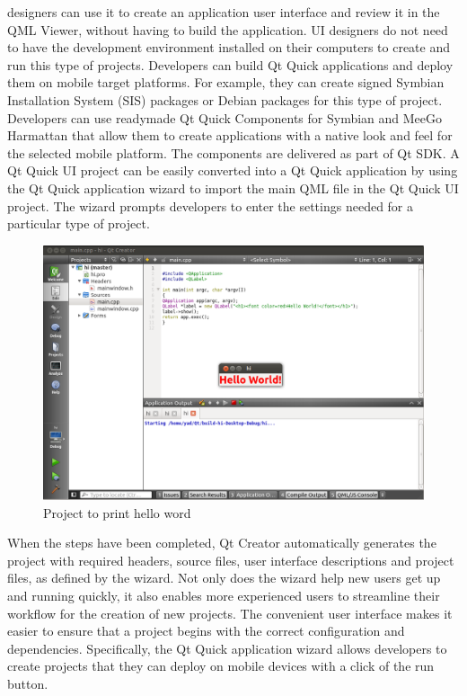designers  can  use  it  to  create  an  application  user  interface  and  review  it  in  the  QML  Viewer,  without
having  to  build  the  application.   UI  designers  do  not  need to have the development environment installed
on their computers to create and run this type of projects.
Developers  can  build  Qt  Quick  applications  and  deploy  them  on  mobile  target platforms. For example,
they  can  create  signed  Symbian  Installation  System  (SIS)  packages or Debian packages for this type of
project.  Developers  can  use  ready­made  Qt  Quick  Components  for  Symbian  and  MeeGo  Harmattan
that  allow  them  to  create  applications  with  a  native  look  and  feel  for  the  selected  mobile  platform.  The
components  are  delivered  as  part  of  Qt SDK. A Qt Quick UI project can be easily  converted into a Qt
Quick  application  by using the Qt Quick  application wizard to import the main QML file in the Qt Quick
UI project. The wizard prompts developers to enter the settings needed for a particular type of project.

\begin{figure}[h]
\begin{center}
\includegraphics[scale=0.4]{images/hi.png}
\caption{Project to print hello word}
\end{center}
\end{figure}

When  the  steps  have  been  completed,  Qt  Creator  automatically  generates  the  project  with  required
headers,  source  files,  user  interface  descriptions  and  project  files,  as  defined  by  the  wizard.  Not  only
does  the  wizard  help  new  users  get  up  and  running  quickly,  it  also  enables  more  experienced  users  to
streamline  their  workflow  for  the  creation  of new projects. The convenient user interface makes it easier
to  ensure  that  a  project  begins  with  the  correct  configuration  and  dependencies.  Specifically,  the  Qt
Quick  application  wizard  allows  developers  to  create  projects  that  they  can  deploy  on  mobile  devices
with a click of the run button.
\newpage


